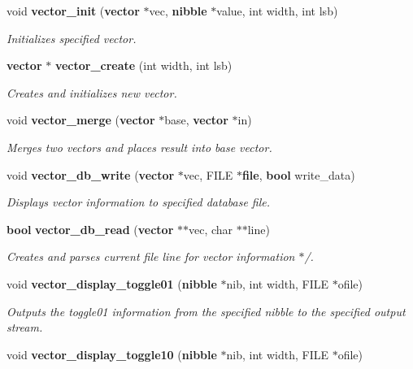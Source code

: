 \begin{CompactItemize}
\item 
void {\bf vector\_\-init} ({\bf vector} $\ast$vec, {\bf nibble} $\ast$value, int width, int lsb)
\begin{CompactList}\small\item\em Initializes specified vector.\item\end{CompactList}\item 
{\bf vector} $\ast$ {\bf vector\_\-create} (int width, int lsb)
\begin{CompactList}\small\item\em Creates and initializes new vector.\item\end{CompactList}\item 
void {\bf vector\_\-merge} ({\bf vector} $\ast$base, {\bf vector} $\ast$in)
\begin{CompactList}\small\item\em Merges two vectors and places result into base vector.\item\end{CompactList}\item 
void {\bf vector\_\-db\_\-write} ({\bf vector} $\ast$vec, FILE $\ast${\bf file}, {\bf bool} write\_\-data)
\begin{CompactList}\small\item\em Displays vector information to specified database file.\item\end{CompactList}\item 
{\bf bool} {\bf vector\_\-db\_\-read} ({\bf vector} $\ast$$\ast$vec, char $\ast$$\ast$line)
\begin{CompactList}\small\item\em Creates and parses current file line for vector information $\ast$/.\item\end{CompactList}\item 
void {\bf vector\_\-display\_\-toggle01} ({\bf nibble} $\ast$nib, int width, FILE $\ast$ofile)
\begin{CompactList}\small\item\em Outputs the toggle01 information from the specified nibble to the specified output stream.\item\end{CompactList}\item 
void {\bf vector\_\-display\_\-toggle10} ({\bf nibble} $\ast$nib, int width, FILE $\ast$ofile)

\end{CompactItemize}
